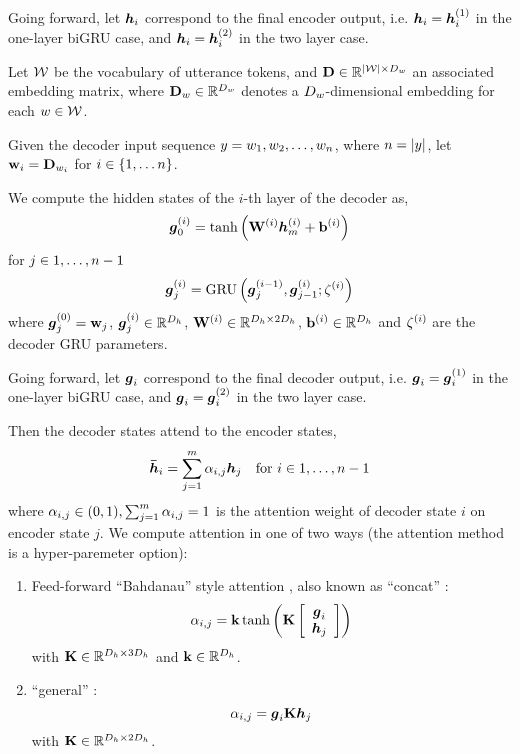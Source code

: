 Going forward, let $\boldsymbol{h}_i$ correspond to the final encoder output, 
i.e. $\boldsymbol{h}_i = \boldsymbol{h}_i^{(1)}$
in the one-layer biGRU case, and $\boldsymbol{h}_i=\boldsymbol{h}_i^{(2)}$ in the two layer 
case.


Let $\mathcal{W}$ be the vocabulary of utterance tokens, and 
$\mathbf{D} \in \mathbb{R}^{{\lvert \mathcal{W} \rvert} \times {D_w}}$
an associated embedding matrix, where
$\mathbf{D}_{w} \in \mathbb{R}^{{D_w}}$ denotes a  ${D_w}$-dimensional embedding for
each $w \in \mathcal{W}$.

Given the decoder input sequence $y = w_1, w_2, \ldots, w_n$, where $n = {\lvert y \rvert}$,
let $\mathbf{w}_i = \mathbf{D}_{w_i}$ for $i \in \{1, \ldots n\}$.


We compute the hidden states of the $i$-th layer of the decoder as,
\begin{align*}
\boldsymbol{g}^{(i)}_0 & = \tanh\left(\mathbf{W}^{(i)} \boldsymbol{h}^{(i)}_m + \mathbf{b}^{(i)}\right)\\
\end{align*}
\noindent for $j \in 1,\ldots,n-1$
\begin{align*}
    \boldsymbol{g}^{(i)}_j &= \operatorname{GRU}\left(\boldsymbol{g}^{(i-1)}_j, \boldsymbol{g}^{(i)}_{j-1};
            {\zeta}^{(i)}\right) \\
\end{align*}
where $\boldsymbol{g}^{(0)}_j = \mathbf{w}_j$, $\boldsymbol{g}^{(i)}_j \in \mathbb{R}^{{D_h}}$, $\mathbf{W}^{(i)} \in \mathbb{R}^{{D_h} \times 2{D_h}}$, $\mathbf{b}^{(i)} \in \mathbb{R}^{{D_h}}$ and ${\zeta}^{(i)}$ are the decoder GRU parameters.

Going forward, let $\boldsymbol{g}_i$ correspond to the final decoder output, 
i.e. $\boldsymbol{g}_i = \boldsymbol{g}_i^{(1)}$
in the one-layer biGRU case, and $\boldsymbol{g}_i=\boldsymbol{g}_i^{(2)}$ in the two layer 
case.

Then the decoder states attend to the encoder states,
\begin{align*}
    \boldsymbol{\bar{h}}_i & = \sum^{m}_{j=1}\alpha_{i,j}\boldsymbol{h}_j & \textrm{for $i \in 1,\ldots, n- 1$}
\end{align*}
where $\alpha_{i,j} \in (0, 1), \sum^{m}_{j=1}\alpha_{i,j} = 1$ is the attention weight of decoder state $i$ on encoder state $j$. We compute 
attention in one of two ways (the attention method is a hyper-paremeter
option):
\begin{enumerate}
\item Feed-forward ``Bahdanau'' style attention \cite{bahdanau2015},
    also known as ``concat'' \cite{luong2015}:
\[ \alpha_{i,j} = \mathbf{k} \tanh\left(\mathbf{K}\left[\begin{array}{c} 
    \boldsymbol{g}_i \\ \boldsymbol{h}_j\end{array}\right] \right)  \] with 
$\mathbf{K} \in \mathbb{R}^{{D_h} \times 3{D_h}}$ and 
$\mathbf{k} \in \mathbb{R}^{{D_h}}$.
\item ``general'' \cite{luong2015} :
    \[ \alpha_{i,j} = \boldsymbol{g}_i \mathbf{K}  \boldsymbol{h}_j  \] with $\mathbf{K} \in \mathbb{R}^{{D_h} \times 2{D_h}}$.
\end{enumerate}

